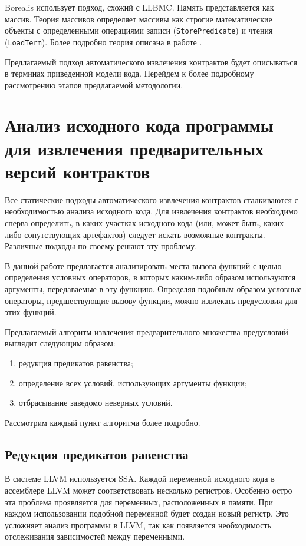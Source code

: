Borealis использует подход, схожий с LLBMC\cite{llbmc}. Память представляется как массив. Теория массивов определяет массивы как строгие математические объекты с определенными операциями записи (\texttt{StorePredicate}) и чтения (\texttt{LoadTerm}). Более подробно теория описана в работе \cite{theoryOfArrays}.

Предлагаемый подход автоматического извлечения контрактов будет описываться в терминах приведенной модели кода. Перейдем к более подробному рассмотрению этапов предлагаемой методологии.

\section{Анализ исходного кода программы для извлечения предварительных версий контрактов}
\label{section:analysis}
Все статические подходы автоматического извлечения контрактов сталкиваются с необходимостью анализа исходного кода. Для извлечения контрактов необходимо сперва определить, в каких участках исходного кода (или, может быть, каких-либо сопутствующих артефактов) следует искать возможные контракты. Различные подходы по своему решают эту проблему.

В данной работе предлагается анализировать места вызова функций с целью определения условных операторов, в которых каким-либо образом используются аргументы, передаваемые в эту функцию. Определяя подобным образом условные операторы, предшествующие вызову функции, можно извлекать предусловия для этих функций.

Предлагаемый алгоритм извлечения предварительного множества предусловий выглядит следующим образом:
\begin{enumerate}
\item редукция предикатов равенства;
\item определение всех условий, использующих аргументы функции;
\item отбрасывание заведомо неверных условий.
\end{enumerate}

Рассмотрим каждый пункт алгоритма более подробно.

\subsection{Редукция предикатов равенства}
\label{subsection:reduction}
В системе LLVM используется SSA. Каждой переменной исходного кода в ассемблере LLVM может соответствовать несколько регистров. Особенно остро эта проблема проявляется для переменных, расположенных  в памяти. При каждом использовании подобной переменной будет создан новый регистр. Это усложняет анализ программы в LLVM, так как появляется необходимость отслеживания зависимостей между переменными.

